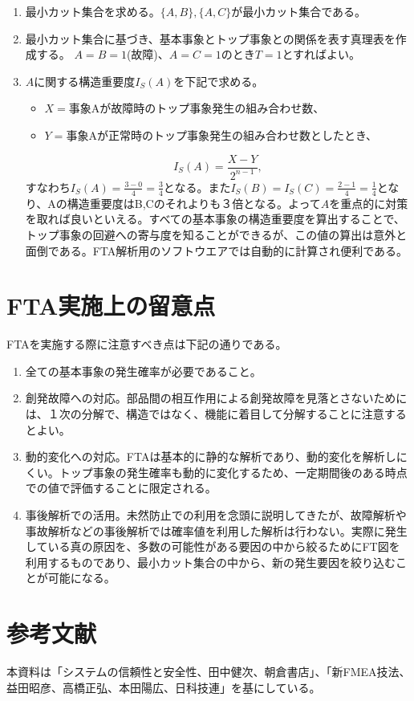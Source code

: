 \begin{enumerate}
\item 最小カット集合を求める。$\{A,B\},\{A,C\}$が最小カット集合である。
\item 最小カット集合に基づき、基本事象とトップ事象との関係を表す真理表を作成する。
$A=B=1$(故障)、$A=C=1$のとき$T=1$とすればよい。
\item $A$に関する構造重要度$I_S(A)$を下記で求める。
\begin{itemize}
\item $X=$事象Aが故障時のトップ事象発生の組み合わせ数、
\item $Y=$事象Aが正常時のトップ事象発生の組み合わせ数としたとき、
\end{itemize}
\[I_S(A) = \frac{X-Y}{2^{n-1}},\]
すなわち$I_S(A)=\frac{3-0}{4}=\frac{3}{4}$となる。また$I_S(B)=I_S(C)=\frac{2-1}{4}=\frac{1}{4}$となり、Aの構造重要度はB,Cのそれよりも３倍となる。よって$A$を重点的に対策を取れば良いといえる。すべての基本事象の構造重要度を算出することで、トップ事象の回避への寄与度を知ることができるが、この値の算出は意外と面倒である。FTA解析用のソフトウエアでは自動的に計算され便利である。
\end{enumerate}
\section{FTA実施上の留意点}
FTAを実施する際に注意すべき点は下記の通りである。
\begin{enumerate}
\item 全ての基本事象の発生確率が必要であること。
\item 創発故障への対応。部品間の相互作用による創発故障を見落とさないためには、１次の分解で、構造ではなく、機能に着目して分解することに注意するとよい。
\item 動的変化への対応。FTAは基本的に静的な解析であり、動的変化を解析しにくい。トップ事象の発生確率も動的に変化するため、一定期間後のある時点での値で評価することに限定される。
\item 事後解析での活用。未然防止での利用を念頭に説明してきたが、故障解析や事故解析などの事後解析では確率値を利用した解析は行わない。実際に発生している真の原因を、多数の可能性がある要因の中から絞るためにFT図を利用するものであり、最小カット集合の中から、新の発生要因を絞り込むことが可能になる。
\end{enumerate}



\section*{参考文献}
本資料は「システムの信頼性と安全性、田中健次、朝倉書店」、「新FMEA技法、益田昭彦、高橋正弘、本田陽広、日科技連」を基にしている。
